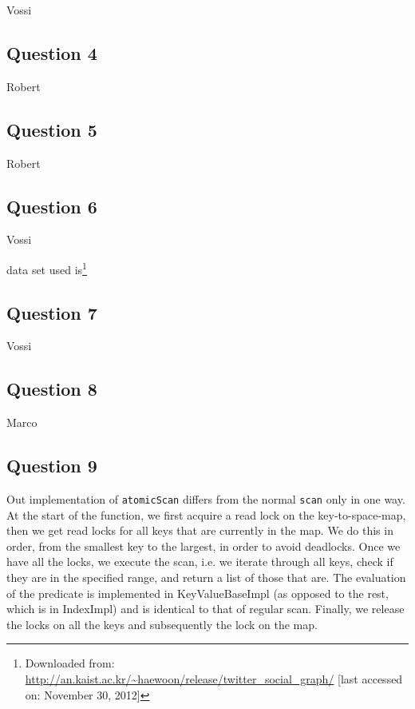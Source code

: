 \documentclass[12pt,a4paper]{article}
\begin{document}
Vossi

\subsection*{Question 4}
\label{sec:pq4}
Robert

\subsection*{Question 5}
\label{sec:pq5}
Robert

\subsection*{Question 6}
\label{sec:pq6}
Vossi

data set used is\footnote{Downloaded from: \url{http://an.kaist.ac.kr/~haewoon/release/twitter_social_graph/} [last accessed on: November 30, 2012]}

\subsection*{Question 7}
\label{sec:pq7} 
Vossi

\subsection*{Question 8}
\label{sec:pq8}
Marco

\subsection*{Question 9}
\label{sec:pq9}
Out implementation of \texttt{atomicScan} differs from the normal \texttt{scan} only in one way. At the start of the function, we first acquire a read lock on the key-to-space-map, then we get read locks for all keys that are currently in the map. We do this in order, from the smallest key to the largest, in order to avoid deadlocks. Once we have all the locks, we execute the scan, i.e. we iterate through all keys, check if they are in the specified range, and return a list of those that are. The evaluation of the predicate is implemented in KeyValueBaseImpl (as opposed to the rest, which is in IndexImpl) and is identical to that of regular scan. Finally, we release the locks on all the keys and subsequently the lock on the map.
\end{document}
